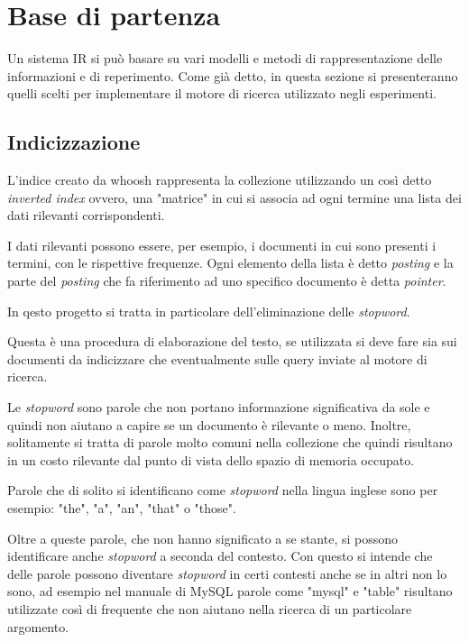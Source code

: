 \documentclass[runningheads]{llncs}
\begin{document}
\section{Base di partenza}
\label{sec:base-di-partenza}
Un sistema IR si pu\`o basare su vari modelli e metodi di rappresentazione delle informazioni e di reperimento.
Come gi\`a detto, in questa sezione si presenteranno quelli scelti per implementare il motore di ricerca utilizzato negli esperimenti.

\subsection{Indicizzazione}
L'indice creato da whoosh rappresenta la collezione utilizzando un cos\`i detto \emph{inverted index}\cite{WBC_ii} ovvero, una "matrice" in cui si associa ad ogni termine
una lista dei dati rilevanti corrispondenti.

I dati rilevanti possono essere, per esempio, i documenti in cui sono presenti i termini, con le rispettive frequenze.
Ogni elemento della lista \`e detto \emph{posting} e la parte del \emph{posting} che fa riferimento ad uno specifico documento
\`e detta \emph{pointer}.

\vskip 0.15in

In qesto progetto si tratta in particolare dell'eliminazione delle \emph{stopword}\cite{WBC_stopword}.

Questa \`e una procedura di elaborazione del testo, se utilizzata si deve fare sia sui documenti da indicizzare 
che eventualmente sulle query inviate al motore di ricerca.

Le \emph{stopword} sono parole che non portano informazione significativa da sole e quindi non aiutano a capire se un documento \`e rilevante o meno.
Inoltre, solitamente si tratta di parole molto comuni nella collezione che quindi risultano in un costo rilevante dal punto di vista dello spazio di memoria occupato.

Parole che di solito si identificano come \emph{stopword} nella lingua inglese sono per esempio: "the", "a", "an", "that" o "those".

Oltre a queste parole, che non hanno significato a se stante, si possono identificare anche \emph{stopword} a seconda del contesto. 
Con questo si intende che delle parole possono diventare \emph{stopword} in certi contesti anche se in altri non lo sono, ad esempio nel manuale di
MySQL parole come "mysql" e "table" risultano utilizzate cos\`i di frequente che non aiutano nella ricerca di un particolare argomento.
\end{document}
